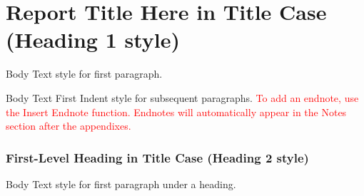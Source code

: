 
\fancyfoot{}




\part{Report Title Here in Title Case (Heading 1 style)}

Body Text style for first paragraph.

Body Text First Indent style for subsequent paragraphs. \textcolor{red}{To add an endnote, use the Insert Endnote function. Endnotes will automatically appear in the Notes section after the appendixes.} 

\section{First-Level Heading in Title Case (Heading 2 style)}

Body Text style for first paragraph under a heading.

